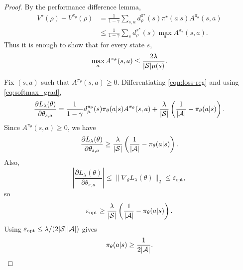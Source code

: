 \begin{proof}
By the performance difference lemma,
\begin{align*}
V^\star(\rho)-V^{\pi_\theta}(\rho)
&=
\frac{1}{1-\gamma}
\sum_{s,a} d_\rho^{\pi^\star}(s)\pi^\star(a|s)A^{\pi_\theta}(s,a) \\
&\le
\frac{1}{1-\gamma}
\sum_s d_\rho^{\pi^\star}(s)\max_{a} A^{\pi_\theta}(s,a).
\end{align*}
Thus it is enough to show that for every state $s$,
\[
\max_a A^{\pi_\theta}(s,a)\le \frac{2\lambda}{|\mathcal{S}|\mu(s)}.
\]

Fix $(s,a)$ such that $A^{\pi_\theta}(s,a)\ge 0$.
Differentiating \eqref{eqn:loss-reg} and using \eqref{eq:softmax_grad},
\begin{equation}\label{eqn:grad-KLobjective}
\frac{\partial L_\lambda(\theta)}{\partial \theta_{s,a}}
=
\frac{1}{1-\gamma} d_\mu^{\pi_\theta}(s)\pi_\theta(a|s)A^{\pi_\theta}(s,a)
+
\frac{\lambda}{|\mathcal{S}|}
\left(\frac{1}{|\mathcal{A}|}-\pi_\theta(a|s)\right).
\end{equation}
Since $A^{\pi_\theta}(s,a)\ge 0$, we have
\[
\frac{\partial L_\lambda(\theta)}{\partial \theta_{s,a}}
\ge
\frac{\lambda}{|\mathcal{S}|}
\left(\frac{1}{|\mathcal{A}|}-\pi_\theta(a|s)\right).
\]
Also,
\[
\left|
\frac{\partial L_\lambda(\theta)}{\partial \theta_{s,a}}
\right|
\le
\|\nabla_\theta L_\lambda(\theta)\|_2
\le
\varepsilon_{\mathrm{opt}},
\]
so
\[
\varepsilon_{\mathrm{opt}}
\ge
\frac{\lambda}{|\mathcal{S}|}
\left(\frac{1}{|\mathcal{A}|}-\pi_\theta(a|s)\right).
\]
Using $\varepsilon_{\mathrm{opt}} \le \lambda/(2|\mathcal{S}||\mathcal{A}|)$ gives
\[
\pi_\theta(a|s)\ge \frac{1}{2|\mathcal{A}|}.
\]


\end{proof}
